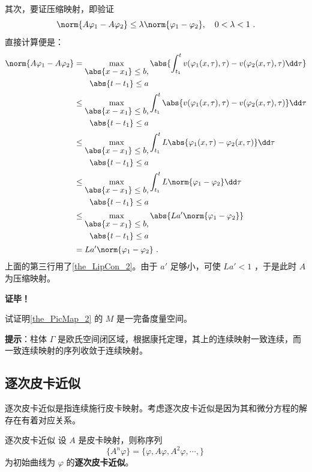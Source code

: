其次，要证压缩映射，即验证 
\begin{equation}
\norm{A\varphi_1-A\varphi_2}\leq\lambda\norm{\varphi_1-\varphi_2},\quad 0<\lambda<1~.
\end{equation}
直接计算便是：
\begin{equation}
\begin{aligned}
\norm{A\varphi_1-A\varphi_2}&=\max_{\begin{aligned}\abs{x-x_1}\leq b,\\\abs{t-t_1}\leq a\end{aligned}}\abs{\int_{t_1}^t v(\varphi_1(x,\tau),\tau)-v(\varphi_2(x,\tau),\tau)\dd \tau}\\
&\leq\max_{\begin{aligned}\abs{x-x_1}\leq b,\\\abs{t-t_1}\leq a\end{aligned}}\int_{t_1}^t \abs{v(\varphi_1(x,\tau),\tau)-v(\varphi_2(x,\tau),\tau)}\dd \tau\\
&\leq \max_{\begin{aligned}\abs{x-x_1}\leq b,\\\abs{t-t_1}\leq a\end{aligned}}\int_{t_1}^t L\abs{\varphi_1(x,\tau)-\varphi_2(x,\tau)}\dd \tau\\
&\leq \max_{\begin{aligned}\abs{x-x_1}\leq b,\\\abs{t-t_1}\leq a\end{aligned}}\int_{t_1}^t L\norm{\varphi_1-\varphi_2}\dd \tau\\
&\leq\max_{\begin{aligned}\abs{x-x_1}\leq b,\\\abs{t-t_1}\leq a\end{aligned}}\abs{ La'\norm{\varphi_1-\varphi_2}}\\
&= La'\norm{\varphi_1-\varphi_2}~.
\end{aligned}
\end{equation}
上面的第三行用了\autoref{the_LipCon_2}。由于 $a'$ 足够小，可使 $La'<1$ ，于是此时 $A$ 为压缩映射。

\textbf{证毕！}
\begin{exercise}{}\label{exe_PicMap_1}{}
试证明\autoref{the_PicMap_2} 的 $M$ 是一完备度量空间。
\end{exercise}
\textbf{提示}：柱体 $\Gamma$ 是欧氏空间闭区域，根据康托定理，其上的连续映射一致连续，而一致连续映射的序列收敛于连续映射。
\subsection{逐次皮卡近似}
逐次皮卡近似是指连续施行皮卡映射。考虑逐次皮卡近似是因为其和微分方程的解存在有着对应关系。
\begin{definition}{逐次皮卡近似}
设 $A$ 是皮卡映射，则称序列
\begin{equation}
\{A^n\varphi\}=\{\varphi, A\varphi, A^2\varphi,\cdots,\}~ 
\end{equation}
为初始曲线为 $\varphi$ 的\textbf{逐次皮卡近似}。
\end{definition}

